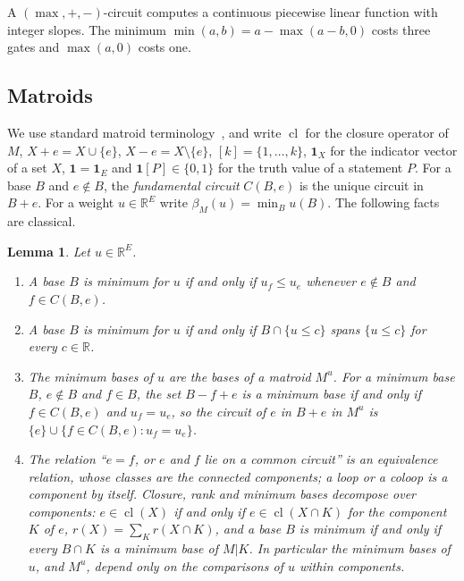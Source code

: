 \documentclass[11pt]{article}
\newtheorem{lemma}[theorem]{Lemma}
\newcommand{\R}{\mathbb R}
\newcommand{\cl}{\operatorname{cl}}
\begin{document}
A $(\max,+,-)$-circuit computes a continuous piecewise linear function with
integer slopes.  The minimum $\min(a,b)=a-\max(a-b,0)$ costs three gates and
$\max(a,0)$ costs one.

\subsection{Matroids}

We use standard matroid terminology~\cite{oxley11,schrijver03}, and write
$\cl$ for the closure operator of $M$, $X+e=X\cup\{e\}$, $X-e=X\setminus\{e\}$, $[k]=\{1,\ldots,k\}$, $\mathbf 1_X$ for the indicator vector of
a set $X$, $\mathbf 1=\mathbf 1_E$ and $\mathbf 1[P]\in\{0,1\}$ for the truth value of a
statement $P$.  For a
base $B$ and $e\notin B$, the \emph{fundamental circuit} $C(B,e)$ is the unique
circuit in $B+e$.  For a weight $u\in\R^{E}$ write
$\beta_M(u)=\min_{B}u(B)$.  The following facts are classical.

\begin{lemma}
\label{lem:minbases}
Let $u\in\R^{E}$.
\begin{enumerate}
  \item A base $B$ is minimum for $u$ if and only if $u_f\le u_e$ whenever
        $e\notin B$ and $f\in C(B,e)$.
  \item A base $B$ is minimum for $u$ if and only if $B\cap\{u\le c\}$ spans
        $\{u\le c\}$ for every $c\in\R$.
  \item The minimum bases of $u$ are the bases of a matroid $M^{u}$.  For a
        minimum base $B$, $e\notin B$ and $f\in B$, the set $B-f+e$ is a minimum
        base if and only if $f\in C(B,e)$ and $u_f=u_e$, so the circuit of $e$ in
        $B+e$ in $M^{u}$ is $\{e\}\cup\{f\in C(B,e):u_f=u_e\}$.
  \item The relation ``$e=f$, or $e$ and $f$ lie on a common circuit'' is an
        equivalence relation, whose classes are the \emph{connected components};
        a loop or a coloop is a component by itself.  Closure, rank and minimum
        bases decompose over components: $e\in\cl(X)$ if and only if
        $e\in\cl(X\cap K)$ for the component $K$ of $e$, $r(X)=\sum_Kr(X\cap K)$,
        and a base $B$ is minimum if and only if every $B\cap K$ is a minimum base
        of $M|K$.  In particular the minimum bases of $u$, and $M^{u}$, depend
        only on the comparisons of $u$ within components.
\end{enumerate}
\end{lemma}
\end{document}
